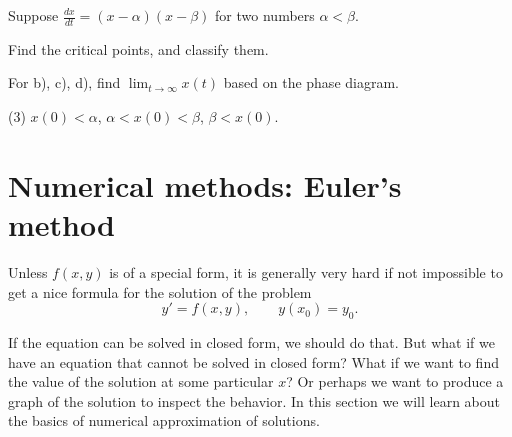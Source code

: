 \begin{exercise}
Suppose $\frac{dx}{dt} = (x-\alpha)(x-\beta)$ for two numbers $\alpha <
\beta$.
\begin{tasks}
\task Find the critical points, and classify them.
\end{tasks}
For b), c), d), find $\displaystyle \lim_{t\to\infty} x(t)$ based on
the phase diagram.
\begin{tasks}[resume](3)
\task $x(0) < \alpha$,
\task $\alpha < x(0) < \beta$,
\task $\beta < x(0)$.
\end{tasks}
\end{exercise}


\sectionnewpage
\section{Numerical methods: Euler's method}
\label{numer:section}


%


Unless $f(x,y)$ is of a special form,
it is generally very hard
if not impossible to get a nice formula for the solution of the problem
\begin{equation*}
y' = f(x,y), \qquad y(x_0) = y_0 .
\end{equation*}

If the equation can be solved in closed form, we should do that.
But what if we have an equation that cannot be solved in closed form?
What if we want to find the value of the solution at some particular $x$?
Or perhaps we want to produce a graph of the solution to inspect the
behavior.  In this section we will learn about the basics of numerical
approximation of solutions.

